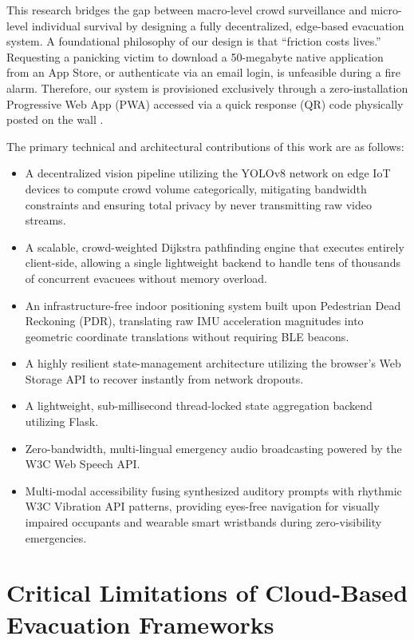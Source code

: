 \documentclass[conference]{IEEEtran}
\begin{document}
This research bridges the gap between macro-level crowd surveillance and micro-level individual
survival by designing a fully decentralized, edge-based evacuation system. A foundational philosophy
of our design is that ``friction costs lives.'' Requesting a panicking victim to download a
50-megabyte native application from an App Store, or authenticate via an email login, is unfeasible
during a fire alarm. Therefore, our system is provisioned exclusively through a zero-installation
Progressive Web App (PWA) accessed via a quick response (QR) code physically posted on the wall
\cite{maji2020}.

The primary technical and architectural contributions of this work are as follows:
\begin{itemize}
    \item A decentralized vision pipeline utilizing the YOLOv8 network on edge IoT devices to compute crowd volume categorically, mitigating bandwidth constraints and ensuring total privacy by never transmitting raw video streams.
    \item A scalable, crowd-weighted Dijkstra pathfinding engine that executes entirely client-side, allowing a single lightweight backend to handle tens of thousands of concurrent evacuees without memory overload.
    \item An infrastructure-free indoor positioning system built upon Pedestrian Dead Reckoning (PDR), translating raw IMU acceleration magnitudes into geometric coordinate translations without requiring BLE beacons.
    \item A highly resilient state-management architecture utilizing the browser's Web Storage API to recover instantly from network dropouts.
    \item A lightweight, sub-millisecond thread-locked state aggregation backend utilizing Flask.
    \item Zero-bandwidth, multi-lingual emergency audio broadcasting powered by the W3C Web Speech API.
    \item Multi-modal accessibility fusing synthesized auditory prompts with rhythmic W3C Vibration API patterns, providing eyes-free navigation for visually impaired occupants and wearable smart wristbands during zero-visibility emergencies.
\end{itemize}

\section{Critical Limitations of Cloud-Based Evacuation Frameworks}
\end{document}
